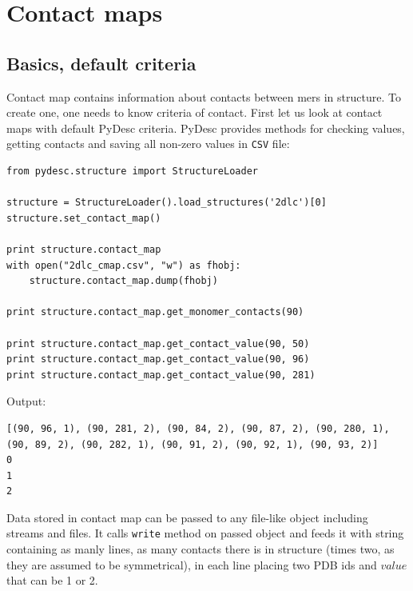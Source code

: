 \documentclass{article}
\begin{document}

\section{Contact maps} \label{CMAPsec}

\subsection{Basics, default criteria}

Contact map contains information about contacts between mers in structure. To create one, one needs to know criteria of contact. First let us look at contact maps with default PyDesc criteria. PyDesc provides methods for checking values, getting contacts and saving all non-zero values in \texttt{CSV} file:
\begin{lstlisting}
from pydesc.structure import StructureLoader

structure = StructureLoader().load_structures('2dlc')[0]
structure.set_contact_map()

print structure.contact_map
with open("2dlc_cmap.csv", "w") as fhobj:
    structure.contact_map.dump(fhobj)

print structure.contact_map.get_monomer_contacts(90)

print structure.contact_map.get_contact_value(90, 50)
print structure.contact_map.get_contact_value(90, 96)
print structure.contact_map.get_contact_value(90, 281)
\end{lstlisting}
Output:
\begin{lstlisting}
[(90, 96, 1), (90, 281, 2), (90, 84, 2), (90, 87, 2), (90, 280, 1), (90, 89, 2), (90, 282, 1), (90, 91, 2), (90, 92, 1), (90, 93, 2)]
0
1
2
\end{lstlisting}


Data stored in contact map can be passed to any file-like object including streams and files. It calls \texttt{write} method on passed object and feeds it with string containing as manly lines, as many contacts there is in structure (times two, as they are assumed to be symmetrical), in each line placing two PDB ids and $value$ that can be 1 or 2.
\end{document}
